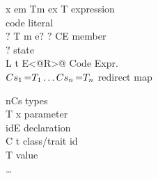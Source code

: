 \noindent
\begin{minipage}{0.65\textwidth}
\begin{bnf}
      {x \mmid{} em \mmid{}Tm
\mmid{} ex \mmid{}  T
}{expression}\\      {
\mmid{} 
}        {code literal}\\      {$?$ T m e$?$ \mmid{} $?$ C\eq{}E }                                                    {member}\\      {$?$}                                          {state}\\      {L \mmid{} t \mmid{}  \mmid{} E\Q@<@R\Q@>@}           {Code Expr.}%
\\      {$Cs_1 \eq{T_1}\ldots Cs_n\eq{T_n}$}                    {redirect map}
\end{bnf}
\end{minipage}
\begin{minipage}[t]{0.5\textwidth}
\begin{bnf}
      {nCs}                                                 {types}\\     {T x}                                                              {parameter}\\      {id\eq{}E}                                                         {declaration}\\     {C \mmid{} t}                                                      {class/trait id}\\      { T}                                                 {value}\\      {\ldots}{}                                                
\end{bnf}
\end{minipage}


